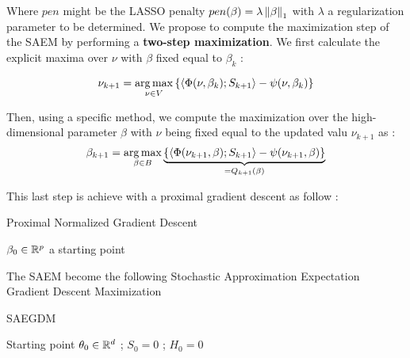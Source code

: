 \documentclass[a4paper]{article}
\begin{document}
\begin{myText}
Where $pen$ might be the LASSO penalty $pen(\beta) = \lambda \left\|\beta\right\|_1$ with $\lambda$ a regularization parameter to be determined. We propose to compute the maximization step of the SAEM by performing a \textbf{two-step maximization}. We first calculate the explicit maxima over $\nu$ with $\beta$ fixed equal to $\beta_k$ :

    $$\nu_{k+1} = \operatorname*{arg\,max}_{\nu\in V}\left\{\left\langle \Phi(\nu,\beta_k) ; S_{k+1}\right\rangle - \psi(\nu, \beta_k) \right\}$$ 

Then, using a specific method, we compute the maximization over the high-dimensional parameter $\beta$ with $\nu$ being fixed equal to the updated valu $\nu_{k+1}$ as : 
    $$\beta_{k+1} = \operatorname*{arg\,max}_{\beta\in B}\underbrace{\left\{\left\langle \Phi(\nu_{k+1},\beta) ; S_{k+1}\right\rangle - \psi(\nu_{k+1}, \beta)\right\}}_{=Q_{k+1}(\beta)} $$

This last step is achieve with a proximal gradient descent as follow : 

\begin{myAlgorithm}[12cm]
    \caption{Proximal Normalized Gradient Descent}\label{PNGD}
    \Initialize $\beta_0 \in \mathbb R^p$ a starting point
    
\end{myAlgorithm}

The SAEM become the following Stochastic Approximation Expectation Gradient Descent Maximization 


\begin{myAlgorithm}[13cm]
    \caption{SAEGDM }
    \Initialize Starting point $\theta_0 \in \mathbb R^d$ ; $S_0 = 0$ ; $H_0 = 0$
    
\end{myAlgorithm}
\end{myText}
\end{document}
